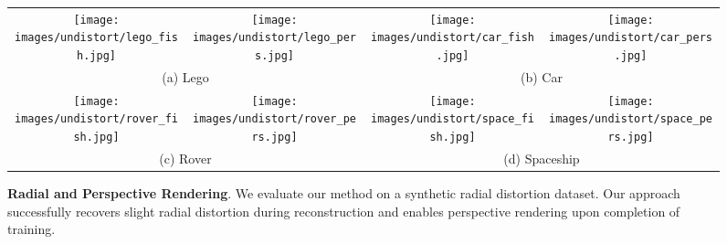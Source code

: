 {
\begin{figure*}[t]
    \centering
    \setlength{\tabcolsep}{1pt} %
    \begin{tabular}{cccc} %
         \texttt{[image: images/undistort/lego\_fish.jpg]} &
        \texttt{[image: images/undistort/lego\_pers.jpg]} &
        \texttt{[image: images/undistort/car\_fish.jpg]} &
        \texttt{[image: images/undistort/car\_pers.jpg]}\\
        \multicolumn{2}{c}{(a) Lego} & \multicolumn{2}{c}{(b) Car}
        \vspace{-0mm}
        \\
        \texttt{[image: images/undistort/rover\_fish.jpg]} &
        \texttt{[image: images/undistort/rover\_pers.jpg]} &
        \texttt{[image: images/undistort/space\_fish.jpg]} &
        \texttt{[image: images/undistort/space\_pers.jpg]}\\
        \multicolumn{2}{c}{(c) Rover} & \multicolumn{2}{c}{(d) Spaceship}
    \end{tabular}

    \caption{\textbf{Radial and Perspective Rendering}. We evaluate our method on a synthetic radial distortion dataset. Our approach successfully recovers slight radial distortion during reconstruction and enables perspective rendering upon completion of training.}

    \label{fig:ours_obj_radial}

\end{figure*}
}